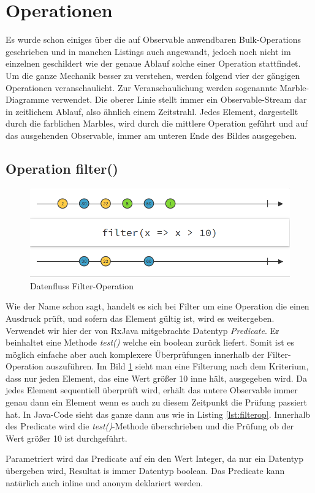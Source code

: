 \section{Operationen}
Es wurde schon einiges über die auf Observable anwendbaren Bulk-Operations geschrieben und in manchen Listings auch angewandt, jedoch noch nicht im einzelnen geschildert wie der genaue Ablauf solche einer Operation stattfindet. Um die ganze Mechanik besser zu verstehen, werden folgend vier der gängigen Operationen veranschaulicht. Zur Veranschaulichung werden sogenannte Marble-Diagramme verwendet. Die oberer Linie stellt immer ein Observable-Stream dar in zeitlichem Ablauf, also ähnlich einem Zeitstrahl. Jedes Element, dargestellt durch die farblichen Marbles, wird durch die mittlere Operation geführt und auf das ausgehenden Observable, immer am unteren Ende des Bildes ausgegeben. 
\subsection{Operation filter()}
\begin{figure}
	\centering
	\includegraphics[width=1\textwidth]{Abb/filter}
	\caption{Datenfluss Filter-Operation}
	\label{pic:filter}
\end{figure}
Wie der Name schon sagt, handelt es sich bei Filter um eine Operation die einen Ausdruck prüft, und sofern das Element gültig ist, wird es weitergeben. Verwendet wir hier der von RxJava mitgebrachte Datentyp \textit{Predicate}. Er beinhaltet eine Methode \textit{test()} welche ein boolean zurück liefert. Somit ist es möglich einfache aber auch komplexere Überprüfungen innerhalb der Filter-Operation auszuführen. Im Bild \ref{pic:filter} sieht man eine Filterung nach dem Kriterium, dass nur jeden Element, das eine Wert größer 10 inne hält, ausgegeben wird. Da jedes Element sequentiell überprüft wird, erhält das untere Observable immer genau dann ein Element wenn es auch zu diesem Zeitpunkt die Prüfung passiert hat. In Java-Code sieht das ganze dann aus wie in Listing \ref{lst:filterop}. Innerhalb des Predicate wird die \textit{test()}-Methode überschrieben und die Prüfung ob der Wert größer 10 ist durchgeführt. 
 
Parametriert wird das Predicate auf ein den Wert Integer, da nur ein Datentyp übergeben wird, Resultat is immer Datentyp boolean. Das Predicate kann natürlich auch inline und anonym deklariert werden.
